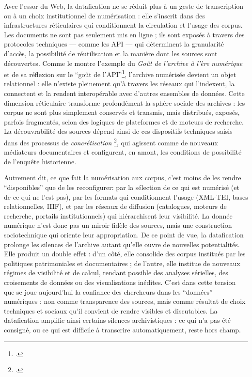 Avec l’essor du Web, la datafication ne se réduit plus à un geste de transcription ou à un choix institutionnel de numérisation : elle s’inscrit dans des infrastructures réticulaires qui conditionnent la circulation et l’usage des corpus. Les documents ne sont pas seulement mis en ligne ; ils sont exposés à travers des protocoles techniques — comme les API — qui déterminent la granularité d’accès, la possibilité de réutilisation et la manière dont les sources sont découvertes. Comme le montre l’exemple du \emph{Goût de l’archive à l’ère numérique} et de sa réflexion sur le \enquote{goût de l’API}\footcite[][]{goutapi}, l’archive numérisée devient un objet relationnel : elle n’existe pleinement qu’à travers les réseaux qui l’indexent, la connectent et la rendent interopérable avec d’autres ensembles de données. Cette dimension réticulaire transforme profondément la sphère sociale des archives : les corpus ne sont plus simplement conservés et transmis, mais distribués, exposés, parfois fragmentés, selon des logiques de plateformes et de moteurs de recherche. La découvrabilité des sources dépend ainsi de ces dispositifs techniques saisis dans des processus de \emph{concrétisation} \footcite[][]{meot}, qui agissent comme de nouveaux médiateurs documentaires et configurent, en amont, les conditions de possibilité de l’enquête historienne. 

Autrement dit, ce que fait la numérisation aux corpus, c’est moins de les rendre \enquote{disponibles} que de les reconfigurer: par la sélection de ce qui est numérisé (et de ce qui ne l’est pas), par les formats qui conditionnent l’usage (XML-TEI, bases relationnelles, IIIF), et par les réseaux de diffusion (catalogues, moteurs de recherche, portails institutionnels) qui hiérarchisent leur visibilité. La donnée numérique n’est donc pas un miroir fidèle des sources, mais une construction sociotechnique qui oriente leur appropriation. De ce point de vue, la datafication prolonge les silences de l’archive autant qu’elle ouvre de nouvelles potentialités. Elle produit un double effet : d’un côté, elle consolide des corpus institués par les politiques patrimoniales et documentaires ; de l’autre, elle institue de nouveaux régimes de visibilité et de calcul, rendant possible des analyses sérielles, des croisements de données ou des visualisations inédites. C’est dans cette tension que se joue aujourd’hui la confiance des chercheurs dans les \enquote{données} numériques : non comme transparence des sources, mais comme résultat de choix techniques et sociaux qu’il convient de rendre visibles et discutables. La datafication amplifie ainsi certains silences archivistiques : ce qui n’a pas été consigné, ou ce qui est difficile à transcrire automatiquement, reste hors champ.

